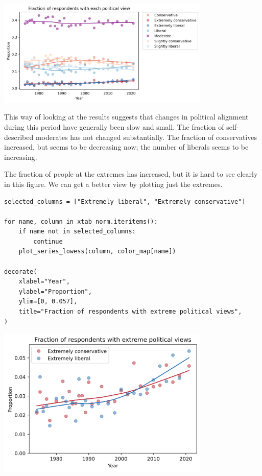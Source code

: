 \begin{center}
\includegraphics[width=4in]{chapters/02_polviews_soln_files/02_polviews_soln_88_0.png}
\end{center}

This way of looking at the results suggests that changes in political
alignment during this period have generally been slow and small. The
fraction of self-described moderates has not changed substantially. The
fraction of conservatives increased, but seems to be decreasing now; the
number of liberals seems to be increasing.

The fraction of people at the extremes has increased, but it is hard to
see clearly in this figure. We can get a better view by plotting just
the extremes.

\begin{lstlisting}[]
selected_columns = ["Extremely liberal", "Extremely conservative"]

for name, column in xtab_norm.iteritems():
    if name not in selected_columns:
        continue
    plot_series_lowess(column, color_map[name])

decorate(
    xlabel="Year",
    ylabel="Proportion",
    ylim=[0, 0.057],
    title="Fraction of respondents with extreme political views",
)
\end{lstlisting}

\begin{center}
\includegraphics[width=4in]{chapters/02_polviews_soln_files/02_polviews_soln_90_0.png}
\end{center}

